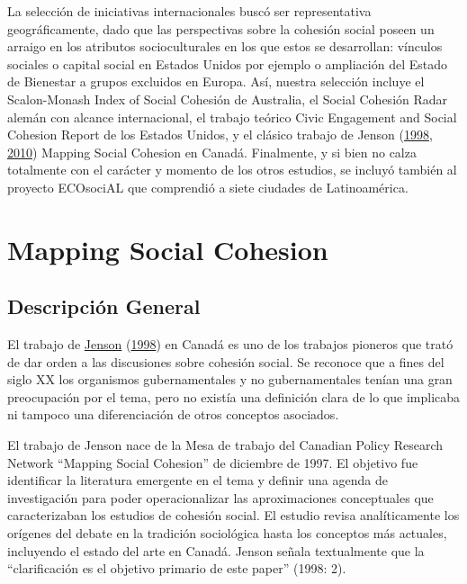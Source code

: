 \documentclass[
  12pt,
]{book}
\begin{document}
La selección de iniciativas internacionales buscó ser representativa geográficamente, dado que las perspectivas sobre la cohesión social poseen un arraigo en los atributos socioculturales en los que estos se desarrollan: vínculos sociales o capital social en Estados Unidos por ejemplo o ampliación del Estado de Bienestar a grupos excluidos en Europa. Así, nuestra selección incluye el Scalon-Monash Index of Social Cohesión de Australia, el Social Cohesión Radar alemán con alcance internacional, el trabajo teórico Civic Engagement and Social Cohesion Report de los Estados Unidos, y el clásico trabajo de Jenson (\protect\hyperlink{ref-jenson1998mapping}{1998}, \protect\hyperlink{ref-jenson2010defining}{2010}) Mapping Social Cohesion en Canadá. Finalmente, y si bien no calza totalmente con el carácter y momento de los otros estudios, se incluyó también al proyecto ECOsociAL que comprendió a siete ciudades de Latinoamérica.

\hypertarget{mapping-social-cohesion}{%
\chapter{Mapping Social Cohesion}\label{mapping-social-cohesion}}

\hypertarget{descripciuxf3n-general}{%
\section{Descripción General}\label{descripciuxf3n-general}}

El trabajo de \protect\hyperlink{ref-jenson1998mapping}{Jenson} (\protect\hyperlink{ref-jenson1998mapping}{1998}) en Canadá es uno de los trabajos
pioneros que trató de dar orden a las discusiones sobre cohesión social.
Se reconoce que a fines del siglo XX los organismos gubernamentales y no
gubernamentales tenían una gran preocupación por el tema, pero no
existía una definición clara de lo que implicaba ni tampoco una diferenciación de otros conceptos asociados.

El trabajo de Jenson nace de la Mesa de trabajo del Canadian Policy
Research Network ``Mapping Social Cohesion'' de diciembre de 1997. El
objetivo fue identificar la literatura emergente en el tema y definir
una agenda de investigación para poder operacionalizar las aproximaciones conceptuales que caracterizaban los estudios de cohesión social. El estudio revisa
analíticamente los orígenes del debate en la tradición sociológica hasta
los conceptos más actuales, incluyendo el estado del arte en Canadá.
Jenson señala textualmente que la ``clarificación es el objetivo primario
de este paper'' (1998: 2).
\end{document}
